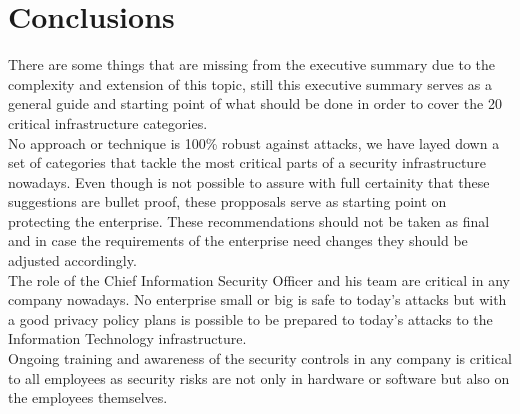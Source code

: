 \section{Conclusions}
There are some things that are missing from the executive summary due to the
complexity and extension of this topic, still this executive summary serves
as a general guide and starting point of what should be done in order to
cover the 20 critical infrastructure categories.\\

No approach or technique is 100\% robust against attacks, we have layed down a
set of categories that tackle the most critical parts of a security
infrastructure nowadays. Even though is not possible to assure with full
certainity that these suggestions are bullet proof, these propposals serve
as starting point on protecting the enterprise. These recommendations should not be
taken as final and in case the requirements of the enterprise need changes
they should be adjusted accordingly.\\

The role of the Chief Information Security Officer and his team are critical
in any company nowadays. No enterprise small or big is safe to today's
attacks but with a good privacy policy plans is possible to be prepared
to today's attacks to the Information Technology infrastructure.\\

Ongoing training and awareness of the security controls in any company is
critical to all employees as security risks are not only in hardware or software
but also on the employees themselves.
